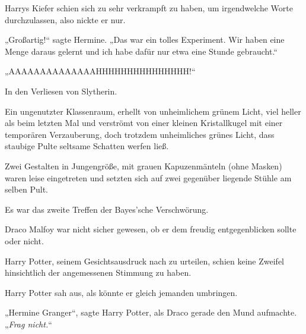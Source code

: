 Harrys Kiefer schien sich zu sehr verkrampft zu haben, um irgendwelche Worte durchzulassen, also nickte er nur.

„Großartig!“ sagte Hermine. „Das war ein tolles Experiment. Wir haben eine Menge daraus gelernt und ich habe dafür nur etwa eine Stunde gebraucht.“

„AAAAAAAAAAAAAAHHHHHHHHHHHHHHH!“

\later

In den Verliesen von Slytherin.

Ein ungenutzter Klassenraum, erhellt von unheimlichem grünem Licht, viel heller als beim letzten Mal und verströmt von einer kleinen Kristallkugel mit einer temporären Verzauberung, doch trotzdem unheimliches grünes Licht, dass staubige Pulte seltsame Schatten werfen ließ.

Zwei Gestalten in Jungengröße, mit grauen Kapuzenmänteln (ohne Masken) waren leise eingetreten und setzten sich auf zwei gegenüber liegende Stühle am selben Pult.

Es war das zweite Treffen der Bayes’sche Verschwörung.

Draco Malfoy war nicht sicher gewesen, ob er dem freudig entgegenblicken sollte oder nicht.

Harry Potter, seinem Gesichtsausdruck nach zu urteilen, schien keine Zweifel hinsichtlich der angemessenen Stimmung zu haben.

Harry Potter sah aus, als könnte er gleich jemanden umbringen.

„Hermine Granger“, sagte Harry Potter, als Draco gerade den Mund aufmachte. „\emph{Frag nicht.}“

